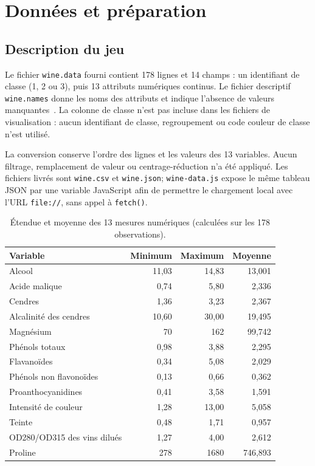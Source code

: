 \documentclass[11pt,a4paper]{article}
\begin{document}
\section{Données et préparation}
\subsection{Description du jeu}
Le fichier \texttt{wine.data} fourni contient 178 lignes et 14 champs : un identifiant de classe (1, 2 ou 3), puis 13 attributs numériques continus. Le fichier descriptif \texttt{wine.names} donne les noms des attributs et indique l'absence de valeurs manquantes~\cite{wine}. La colonne de classe n'est pas incluse dans les fichiers de visualisation : aucun identifiant de classe, regroupement ou code couleur de classe n'est utilisé.

La conversion conserve l'ordre des lignes et les valeurs des 13 variables. Aucun filtrage, remplacement de valeur ou centrage-réduction n'a été appliqué. Les fichiers livrés sont \texttt{wine.csv} et \texttt{wine.json}; \texttt{wine-data.js} expose le même tableau JSON par une variable JavaScript afin de permettre le chargement local avec l'URL \texttt{file://}, sans appel à \texttt{fetch()}.

\begin{table}[H]
\centering
\small
\caption{Étendue et moyenne des 13 mesures numériques (calculées sur les 178 observations).}
\label{tab:descriptives}
\begin{tabularx}{\textwidth}{@{}>{\raggedright\arraybackslash}Xrrr@{}}
\toprule
\textbf{Variable} & \textbf{Minimum} & \textbf{Maximum} & \textbf{Moyenne} \\
\midrule
Alcool & 11,03 & 14,83 & 13,001 \\
Acide malique & 0,74 & 5,80 & 2,336 \\
Cendres & 1,36 & 3,23 & 2,367 \\
Alcalinité des cendres & 10,60 & 30,00 & 19,495 \\
Magnésium & 70 & 162 & 99,742 \\
Phénols totaux & 0,98 & 3,88 & 2,295 \\
Flavanoïdes & 0,34 & 5,08 & 2,029 \\
Phénols non flavonoïdes & 0,13 & 0,66 & 0,362 \\
Proanthocyanidines & 0,41 & 3,58 & 1,591 \\
Intensité de couleur & 1,28 & 13,00 & 5,058 \\
Teinte & 0,48 & 1,71 & 0,957 \\
OD280/OD315 des vins dilués & 1,27 & 4,00 & 2,612 \\
Proline & 278 & 1680 & 746,893 \\
\bottomrule
\end{tabularx}
\end{table}
\end{document}
